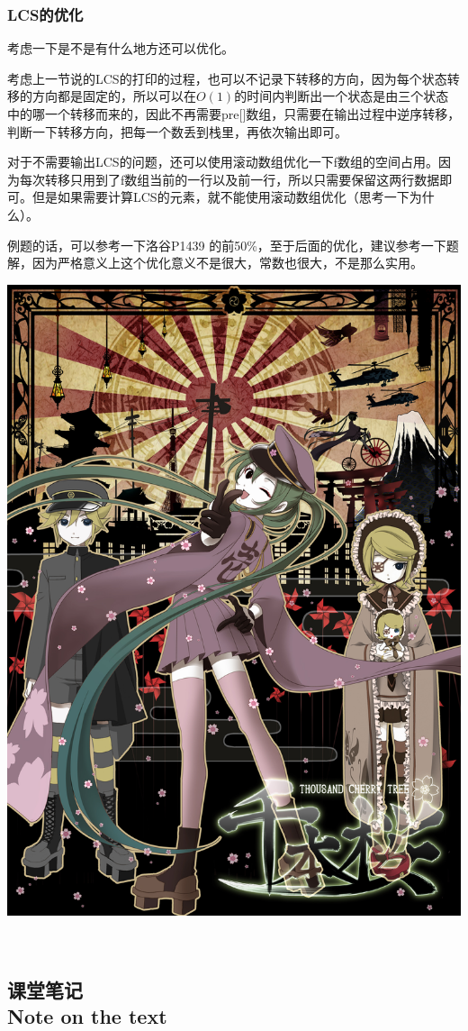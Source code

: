 \documentclass{article}
\theoremstyle{nonumberplain}
\newcommand{\note}{\ \par


	\subsection*{课堂笔记\\\tiny{Note on the text}}
	\newpage}
\begin{document}
\subsubsection{LCS的优化}
考虑一下是不是有什么地方还可以优化。

考虑上一节说的LCS的打印的过程，也可以不记录下转移的方向，因为每个状态转移的方向都是固定的，所以可以在$O(1)$的时间内判断出一个状态是由三个状态中的哪一个转移而来的，因此不再需要pre[]数组，只需要在输出过程中逆序转移，判断一下转移方向，把每一个数丢到栈里，再依次输出即可。

对于不需要输出LCS的问题，还可以使用滚动数组优化一下f数组的空间占用。因为每次转移只用到了f数组当前的一行以及前一行，所以只需要保留这两行数据即可。但是如果需要计算LCS的元素，就不能使用滚动数组优化（思考一下为什么）。

例题的话，可以参考一下洛谷P1439 的前50\%，至于后面的优化，建议参考一下题解，因为严格意义上这个优化意义不是很大，常数也很大，不是那么实用。
\begin{center}\includegraphics[scale=0.08]{21804232_p0.jpg}\end{center}
\note
\end{document}
